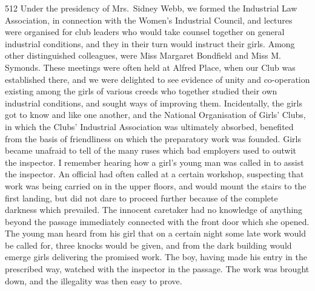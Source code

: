 \begin{tp}{512}
Under the presidency of Mrs.\ Sidney Webb, we formed
the Industrial Law Association, in connection with the
Women’s Industrial Council, and lectures were organised
for club leaders who would take counsel together on
general industrial conditions, and they in their turn would
instruct their girls. Among other distinguished colleagues,
were Miss Margaret Bondfield and Miss M. Symonds.
These meetings were often held at Alfred Place, when our
Club was established there, and we were delighted to see
evidence of unity and co-operation existing among the
girls of various creeds who together studied their own
industrial conditions, and sought ways of improving them.
Incidentally, the girls got to know and like one another,
and the National Organisation of Girls’ Clubs, in which
the Clubs’ Industrial Association was ultimately absorbed,
benefited from the basis of friendliness on which the
preparatory work was founded. Girls became unafraid to
tell of the many ruses which bad employers used to outwit
the inspector. I remember hearing how a girl's young
man was called in to assist the inspector. An official had
often called at a certain workshop, suspecting that work
was being carried on in the upper floors, and would
mount the stairs to the first landing, but did not dare to
proceed further because of the complete darkness which
prevailed. The innocent caretaker had no knowledge of
anything beyond the passage immediately connected with
the front door which she opened. The young man heard
from his girl that on a certain night some late work would
be called for, three knocks would be given, and from the
dark building would emerge girls delivering the promised
work. The boy, having made his entry in the prescribed
way, watched with the inspector in the passage. The
work was brought down, and the illegality was then easy
to prove.
\end{tp}

